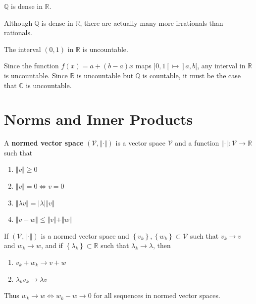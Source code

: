 \documentclass[10pt]{report}
\begin{document}
\begin{prop}
$\mathbb{Q}$ is dense in $\mathbb{R}$.
\end{prop}

Although $\mathbb{Q}$ is dense in $\mathbb{R}$, there are actually many more irrationals than rationals.

\begin{prop}[]
	The interval $(0,1)$ in $\mathbb{R}$ is uncountable.
\end{prop}

Since the function $f(x) = a + (b-a)x$ maps $]0,1[ \mapsto ]a,b[$, any interval in $\mathbb{R}$ is uncountable. Since $\mathbb{R}$ is uncountable but $\mathbb{Q}$ is countable, it must be the case that $\mathbb{C}$ is uncountable.

\section{Norms and Inner Products}

\begin{defn}[]
	A \textbf{normed vector space} $(\mathcal{V}, \Vert{\cdot}\Vert)$ is a vector space $\mathcal{V}$ and a function $\Vert{\cdot}\Vert:\mathcal{V}\to\mathbb{R}$ such that
	\begin{enumerate}
		\item $\Vert{v}\Vert\geq 0$ 
		\item $\Vert{v}\Vert=0 \iff v=0$
		\item $\Vert{\lambda v}\Vert=|\lambda| \Vert{v}\Vert$ 
		\item $\Vert{v+w}\Vert\leq \Vert{v}\Vert+\Vert{w}\Vert$
	\end{enumerate}
\end{defn}

\begin{prop}
	If $(\mathcal{V},\Vert{\cdot}\Vert)$ is a normed vector space and $\left\{ v_k \right\}, \left\{ w_k \right\} \subset \mathcal{V}$ such that $v_k \to v$ and $w_k \to w$, and if $\left\{ \lambda_k \right\} \subset \mathbb{R}$ such that $\lambda_k \to \lambda$, then
	\begin{enumerate}
		\item $v_k + w_k \to v+w$
		\item $\lambda_k v_k \to \lambda v$
	\end{enumerate}
\end{prop}

Thus $w_k \to w \iff w_k - w \to 0$ for all sequences in normed vector spaces.
\end{document}
